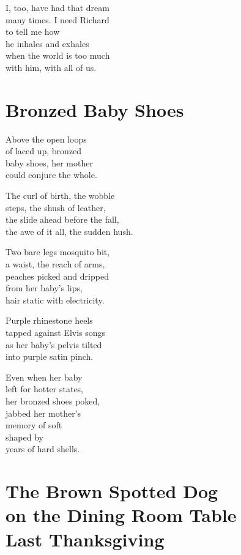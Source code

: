 \documentclass[twoside,10pt]{book}
\begin{document}
I, too, have had that dream\\
many times. I need Richard\\
to tell me how\\
he inhales and exhales\\
when the world is too much\\
with him, with all of us.


\clearpage
\section{Bronzed Baby Shoes}

Above the open loops\\
of laced up, bronzed\\
baby shoes, her mother\\
could conjure the whole.

The curl of birth, the wobble\\
steps, the shush of leather,\\
the slide ahead before the fall,\\
the awe of it all, the sudden hush.

Two bare legs mosquito bit,\\
a waist, the reach of arms,\\
peaches picked and dripped\\
from her baby's lips,\\
hair static with electricity.

Purple rhinestone heels\\
tapped against Elvis songs\\
as her baby's pelvis tilted\\
into purple satin pinch.

Even when her baby\\
left for hotter states,\\
her bronzed shoes poked,\\
jabbed her mother's\\
memory of soft\\
shaped by\\
years of hard shells.


\clearpage
\section{The Brown Spotted Dog\\
  on the Dining Room Table\\
  Last Thanksgiving}
\end{document}
